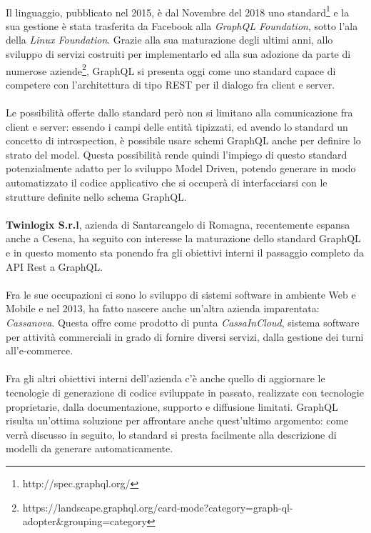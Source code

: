 \documentclass[a4paper, 12pt]{report}
\begin{document}
    \paragraph*{}
      Il linguaggio, pubblicato nel 2015, è dal Novembre del 2018 uno standard\footnote{http://spec.graphql.org/} e la sua gestione è stata trasferita da Facebook alla \emph{GraphQL Foundation}, sotto l'ala della \emph{Linux Foundation}.
      Grazie alla sua maturazione degli ultimi anni, allo sviluppo di servizi costruiti per implementarlo ed alla sua adozione da parte di numerose aziende\footnote{https://landscape.graphql.org/card-mode?category=graph-ql-adopter\&grouping=category}, GraphQL si presenta oggi come uno standard capace di competere con l'architettura di tipo REST per il dialogo fra client e server.
    \paragraph*{}
      Le possibilità offerte dallo standard però non si limitano alla comunicazione fra client e server: essendo i campi delle entità tipizzati, ed avendo lo standard un concetto di introspection, è possibile usare 
      schemi GraphQL anche per definire lo strato del model.
      Questa possibilità rende quindi l'impiego di questo standard potenzialmente adatto per lo sviluppo Model Driven, potendo generare in modo automatizzato il codice applicativo che si occuperà di interfacciarsi con le strutture definite nello schema GraphQL.
    \paragraph*{}
      \textbf{Twinlogix S.r.l}, azienda di Santarcangelo di Romagna, recentemente espansa anche a Cesena, ha seguito con interesse la maturazione dello standard GraphQL e in questo momento sta ponendo fra gli obiettivi interni il passaggio completo da API Rest a GraphQL.
    \paragraph*{}
      Fra le sue occupazioni ci sono lo sviluppo di sistemi software in ambiente Web e Mobile e nel 2013, ha fatto nascere anche un'altra azienda imparentata: \emph{Cassanova}.
      Questa offre come prodotto di punta \emph{CassaInCloud}, sistema software per attività commerciali in grado di fornire diversi servizi, dalla gestione dei turni all'e-commerce.
    \paragraph*{}
      Fra gli altri obiettivi interni dell'azienda c'è anche quello di aggiornare le tecnologie di generazione di codice sviluppate in passato, realizzate con tecnologie proprietarie, dalla documentazione, supporto e diffusione limitati.
      GraphQL risulta un'ottima soluzione per affrontare anche quest'ultimo argomento: come verrà discusso in seguito, lo standard si presta facilmente alla descrizione di modelli da generare automaticamente.
\end{document}

